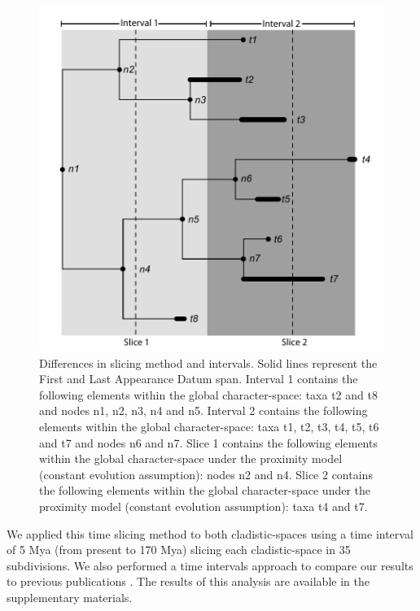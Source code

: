 \documentclass[12pt,letterpaper]{article}
\begin{document}
\begin{figure}[!htbp]
\centering
    \includegraphics[keepaspectratio=true]{Figures/Slicing.pdf}
\caption{Differences in slicing method and intervals. Solid lines represent the First and Last Appearance Datum span. Interval 1 contains the following elements within the global character-space: taxa t2 and t8 and nodes n1, n2, n3, n4 and n5. Interval 2 contains the following elements within the global character-space: taxa t1, t2, t3, t4, t5, t6 and t7 and nodes n6 and n7. Slice 1 contains the following elements within the global character-space under the proximity model (constant evolution assumption): nodes n2 and n4. Slice 2 contains the following elements within the global character-space under the proximity model (constant evolution assumption): taxa t4 and t7.}
\label{fig_slicing}
\end{figure}

We applied this time slicing method to both cladistic-spaces \citep{MEE3:MEE312084,beckancient2014} using a time interval of 5 Mya (from present to 170 Mya) slicing each cladistic-space in 35 subdivisions. We also performed a time intervals approach to compare our results to previous publications \citep[e.g.][]{Brusatte12092008,brusattedinosaur2012,toljagictriassic-jurassic2013}. The results of this analysis are available in the supplementary materials.
\end{document}
